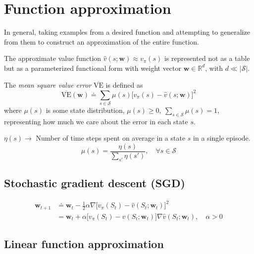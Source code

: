 \section{Function approximation}

In general, taking examples from a desired function and attempting to generalize from them to construct an approximation of the entire function.

The approximate value function \( \hat v(s; \mathbf{w}) \approx v_\pi(s) \) is represented not as a table but as a parameterized functional form with weight vector \( \mathbf{w} \in \mathbb{R}^d \), with \( d \ll \vert \mathcal{S} \vert \).

The \textit{mean square value error} \( \overline{\text{VE}} \) is defined as
\begin{equation}
    \overline{\text{VE}}(\mathbf{w}) \doteq \sum_{s \in \mathcal{S}} \mu(s) {\Big[ v_\pi(s) - \hat v(s; \mathbf{w}) \Big]}^2
\end{equation}
where \( \mu(s) \) is some state distribution, \( \mu(s) \geq 0, \ \sum_{s \in \mathcal{S}} \mu(s) = 1 \), representing how much we care about the error in each state \( s \).

\( \eta(s) \to \) Number of time steps spent on average in a state \( s \) in a single episode.
\begin{equation}
    \mu(s) = \frac{\eta(s)}{\sum_{s'} \eta(s')}
    , \quad \forall s \in \mathcal{S}
\end{equation}

\subsection{Stochastic gradient descent (SGD)}

\begin{equation}
    \begin{aligned}
        \mathbf{w}_{t+1}
         & \doteq
        \mathbf{w}_t - \frac{1}{2} \alpha \nabla {\Big[ v_\pi(S_t) - \hat v(S_t; \mathbf{w}_t) \Big]}^2
        \\ & =
        \mathbf{w}_t + \alpha \Big[ v_\pi(S_t) - \hat v(S_t; \mathbf{w}_t) \Big] \nabla \hat v(S_t; \mathbf{w}_t)
        , \quad \alpha > 0
    \end{aligned}
\end{equation}

\subsection{Linear function approximation}
